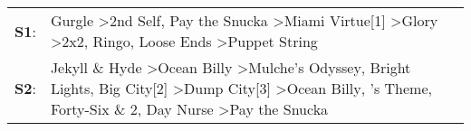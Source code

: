 \begin{supertabular}{p{0.03\textwidth}p{0.92\textwidth}}
 \textbf{S1}:  &                                                                                         Gurgle\textsuperscript{} \textgreater \enspace 2nd Self\textsuperscript{}, \enspace Pay the Snucka\textsuperscript{} \textgreater \enspace Miami Virtue[1]\textsuperscript{} \textgreater \enspace Glory\textsuperscript{} \textgreater \enspace 2x2\textsuperscript{}, \enspace Ringo\textsuperscript{}, \enspace Loose Ends\textsuperscript{} \textgreater \enspace Puppet String\textsuperscript{}  \enspace  \\
 \textbf{S2}:  &  Jekyll \& Hyde\textsuperscript{} \textgreater \enspace Ocean Billy\textsuperscript{} \textgreater \enspace Mulche's Odyssey\textsuperscript{}, \enspace Bright Lights, Big City[2]\textsuperscript{} \textgreater \enspace Dump City[3]\textsuperscript{} \textgreater \enspace Ocean Billy\textsuperscript{}, 's Theme\textsuperscript{}, \enspace Forty-Six \& 2\textsuperscript{}, \enspace Day Nurse\textsuperscript{} \textgreater \enspace Pay the Snucka\textsuperscript{}  \enspace  \\
\end{supertabular}
